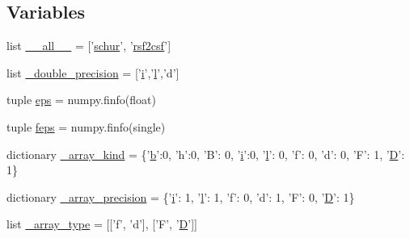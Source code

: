\subsection*{Variables}
\begin{DoxyCompactItemize}
\item 
list \hyperlink{namespacescipy_1_1linalg_1_1decomp__schur_ad28d55f825fb195698f9183379595ba1}{\+\_\+\+\_\+all\+\_\+\+\_\+} = \mbox{[}'\hyperlink{namespacescipy_1_1linalg_1_1decomp__schur_ac53f71422f1b2beef35daf1f09e24e67}{schur}', '\hyperlink{namespacescipy_1_1linalg_1_1decomp__schur_a46c66e09bba3b88752ecdf20820476ca}{rsf2csf}'\mbox{]}
\item 
list \hyperlink{namespacescipy_1_1linalg_1_1decomp__schur_ad2f19b0afbd9ac7726320e84f767c528}{\+\_\+double\+\_\+precision} = \mbox{[}'\hyperlink{indexexpr_8h_aabd77643995707c185e95c8cb2782c81}{i}','\hyperlink{indexexpr_8h_a88aacdaa46b76729743ee33ef8b95a58}{l}','d'\mbox{]}
\item 
tuple \hyperlink{namespacescipy_1_1linalg_1_1decomp__schur_a1dad44a280fa110f881719af6845e93a}{eps} = numpy.\+finfo(float)
\item 
tuple \hyperlink{namespacescipy_1_1linalg_1_1decomp__schur_a270f819ccd3f1c74e6fbabfab2677a8c}{feps} = numpy.\+finfo(single)
\item 
dictionary \hyperlink{namespacescipy_1_1linalg_1_1decomp__schur_a8d395e7398502384e8f125487fc4beff}{\+\_\+array\+\_\+kind} = \{'\hyperlink{gen__mat5files_8m_a7b38767b3b6a8dae167e5afa4fc340b0}{b}'\+:0, 'h'\+:0, 'B'\+: 0, '\hyperlink{indexexpr_8h_aabd77643995707c185e95c8cb2782c81}{i}'\+:0, '\hyperlink{indexexpr_8h_a88aacdaa46b76729743ee33ef8b95a58}{l}'\+: 0, 'f'\+: 0, 'd'\+: 0, 'F'\+: 1, '\hyperlink{odrpack_8h_a7dae6ea403d00f3687f24a874e67d139}{D}'\+: 1\}
\item 
dictionary \hyperlink{namespacescipy_1_1linalg_1_1decomp__schur_a2af49e2309599ba19009871ad098da08}{\+\_\+array\+\_\+precision} = \{'\hyperlink{indexexpr_8h_aabd77643995707c185e95c8cb2782c81}{i}'\+: 1, '\hyperlink{indexexpr_8h_a88aacdaa46b76729743ee33ef8b95a58}{l}'\+: 1, 'f'\+: 0, 'd'\+: 1, 'F'\+: 0, '\hyperlink{odrpack_8h_a7dae6ea403d00f3687f24a874e67d139}{D}'\+: 1\}
\item 
list \hyperlink{namespacescipy_1_1linalg_1_1decomp__schur_a1150815720cb4787dc838ec5c857d0cb}{\+\_\+array\+\_\+type} = \mbox{[}\mbox{[}'f', 'd'\mbox{]}, \mbox{[}'F', '\hyperlink{odrpack_8h_a7dae6ea403d00f3687f24a874e67d139}{D}'\mbox{]}\mbox{]}
\end{DoxyCompactItemize}


